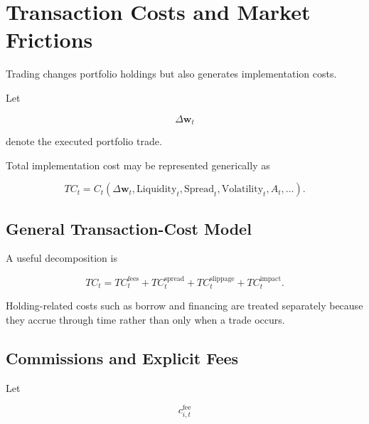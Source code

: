 \documentclass[11pt,a4paper]{article}
\begin{document}
\section{Transaction Costs and Market Frictions}
\label{sec:transaction_costs_market_frictions}

Trading changes portfolio holdings but also generates implementation costs.

Let

\begin{equation}
\Delta\mathbf{w}_t
\end{equation}

denote the executed portfolio trade.

Total implementation cost may be represented generically as

\begin{equation}
\boxed{
TC_t
=
C_t
\left(
\Delta\mathbf{w}_t,
\mathrm{Liquidity}_t,
\mathrm{Spread}_t,
\mathrm{Volatility}_t,
A_t,
\ldots
\right).
}
\end{equation}


\subsection{General Transaction-Cost Model}

A useful decomposition is

\begin{equation}
\boxed{
TC_t
=
TC_t^{\mathrm{fees}}
+
TC_t^{\mathrm{spread}}
+
TC_t^{\mathrm{slippage}}
+
TC_t^{\mathrm{impact}}.
}
\end{equation}

Holding-related costs such as borrow and financing are treated separately because
they accrue through time rather than only when a trade occurs.


\subsection{Commissions and Explicit Fees}

Let

\begin{equation}
c_{i,t}^{\mathrm{fee}}
\end{equation}
\end{document}

